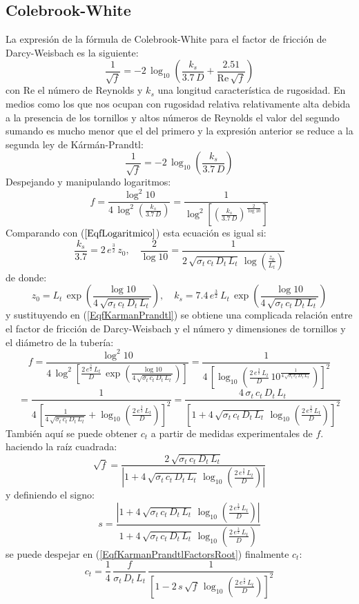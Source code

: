 \documentclass[a4paper]{article}
\newcommand{\EQ}[2]{\begin{equation}#1\label{#2}\end{equation}}
\begin{document}
\subsection{Colebrook-White}

La expresión de la fórmula de Colebrook-White para el factor de fricción de
Darcy-Weisbach es la siguiente:
\EQ
{
  \frac1{\sqrt{f}}=-2\,\log_{10}\left(\frac{k_s}{3.7\,D}
  +\frac{2.51}{\mathrm{Re}\,\sqrt{f}}\right)
}{EqColebrookWhite}
con Re el número de Reynolds y $k_s$ una longitud característica de rugosidad.
En medios como los que nos ocupan con rugosidad relativa relativamente alta
debida a la presencia de los tornillos y altos números de Reynolds el valor del
segundo sumando es mucho menor que el del primero y la expresión anterior se
reduce a la segunda ley de Kármán-Prandtl:
\EQ{\frac1{\sqrt{f}}=-2\,\log_{10}\left(\frac{k_s}{3.7\,D}\right)}
{EqKarmanPrandtl}
Despejando y manipulando logaritmos:
\EQ
{
  f=\frac{\log^2 10}{4\,\log^2\left(\frac{k_s}{3.7\,D}\right)}
  =\frac1{\log^2\left[\left(\frac{k_s}{3.7\,D}\right)^{\frac2{\log 10}}\right]}
}{EqfKarmanPrandtl}
Comparando con ($\ref{EqfLogaritmico}$) esta ecuación es igual si:
\EQ
{
  \frac{k_s}{3.7}=2\,e^{\frac32}\,z_0,\quad
  \frac{2}{\log 10}
  =\frac1{2\,\sqrt{\sigma_t\,c_t\,D_t\,L_t}\,\log\left(\frac{z_0}{L_t}\right)}
}{EqRugosidadesI}
de donde:
\EQ
{
  z_0=L_t\,\exp\left(\frac{\log 10}{4\,\sqrt{\sigma_t\,c_t\,D_t\,L_t}}\right),
  \quad
  k_s=7.4\,e^{\frac32}\,L_t
  \,\exp\left(\frac{\log 10}{4\,\sqrt{\sigma_t\,c_t\,D_t\,L_t}}\right)
}{EqRugosidadesII}
y sustituyendo en (\ref{EqfKarmanPrandtl}) se obtiene una complicada relación
entre el factor de fricción de Darcy-Weisbach y el número y dimensiones de
tornillos y el diámetro de la tubería:
\[
  f=\frac{\log^2 10}{4\,\log^2\left[\frac{2\,e^{\frac32}\,L_t}{D}
  \,\exp\left(\frac{\log 10}{4\,\sqrt{\sigma_t\,c_t\,D_t\,L_t}}\right)\right]}
  =\frac1{4\,\left[\log_{10}\left(\frac{2\,e^{\frac32}\,L_t}{D}
  \,10^{\frac1{4\,\sqrt{\sigma_t\,c_t\,D_t\,L_t}}}\right)\right]^2}
\]
\EQ
{
  =\frac1{4\,\left[\frac1{4\,\sqrt{\sigma_t\,c_t\,D_t\,L_t}}
  +\log_{10}\left(\frac{2\,e^{\frac32}\,L_t}{D}\right)\right]^2}
  =\frac{4\,\sigma_t\,c_t\,D_t\,L_t}{\left[1+4\,\sqrt{\sigma_t\,c_t\,D_t\,L_t}
  \,\log_{10}\left(\frac{2\,e^{\frac32}\,L_t}{D}\right)\right]^2}
}{EqfKarmanPrandtlFactors}
También aquí se puede obtener $c_t$ a partir de medidas experimentales de $f$.
haciendo la raíz cuadrada:
\EQ
{
  \sqrt{f}=\frac{2\,\sqrt{\sigma_t\,c_t\,D_t\,L_t}}
  {\left|1+4\,\sqrt{\sigma_t\,c_t\,D_t\,L_t}
  \,\log_{10}\left(\frac{2\,e^{\frac32}\,L_t}{D}\right)\right|}
}{EqfKarmanPrandtlFactorsRoot}
y definiendo el signo:
\EQ
{
  s=\frac{\left|1+4\,\sqrt{\sigma_t\,c_t\,D_t\,L_t}
  \,\log_{10}\left(\frac{2\,e^{\frac32}\,L_t}{D}\right)\right|}
  {1+4\,\sqrt{\sigma_t\,c_t\,D_t\,L_t}
  \,\log_{10}\left(\frac{2\,e^{\frac32}\,L_t}{D}\right)}
}{EqfKarmanPrandtlFactorsSign}
se puede despejar en (\ref{EqfKarmanPrandtlFactorsRoot}) finalmente $c_t$:
\EQ
{
  c_t=\frac14\,\frac{f}{\sigma_t\,D_t\,L_t}\,\frac1{\left[
  1-2\,s\,\sqrt{f}\,\log_{10}\left(\frac{2\,e^{\frac32}\,L_t}{D}\right)\right]^2}
}{EqfKarmanPrandtlct}
\end{document}
